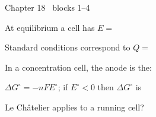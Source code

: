 \documentclass{apchem-worksheet}
\begin{document}
\begin{spiralstrip}{Chapter 18 \textbullet\ blocks 1--4}
  \item At equilibrium a cell has $E = $ 
  \item Standard conditions correspond to $Q = $ 
  \item In a concentration cell, the anode is the:
  \item $\Delta G^\circ = -nFE^\circ$; if $E^\circ < 0$ then $\Delta G^\circ$
        is 
  \item Le Ch\^atelier applies to a running cell?
\end{spiralstrip}
\end{document}
